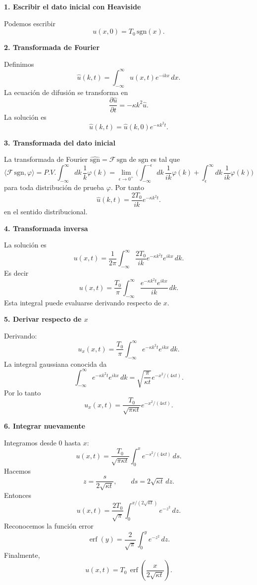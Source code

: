 \documentclass[11pt,spanish]{article}
\begin{document}
{\bf 1. Escribir el dato inicial con Heaviside}

Podemos escribir
$$
u(x,0)
=
T_0\,
\mathrm{sgn}(x).
$$

{\bf 2. Transformada de Fourier}

Definimos
$$
\hat u(k,t)
=
\int_{-\infty}^{\infty}
u(x,t)e^{-ikx}\,dx.
$$
La ecuación de difusión se transforma en
$$
\frac{\partial \hat u}{\partial t}
=
-\kappa k^2 \hat u.
$$
La solución es
$$
\hat u(k,t)
=
\hat u(k,0)
e^{-\kappa k^2 t}.
$$

{\bf 3. Transformada del dato inicial}

La transformada de Fourier $\widehat{\mathrm{sgn}}=\mathcal{F}\,\mathrm{sgn}$ de $\mathrm{sgn}$ es tal que
$$
\langle \mathcal{F}\,\mathrm{sgn},\varphi \rangle
=
P.V.
\int_{-\infty}^{\infty}
dk\,
\frac{1}{k}
\varphi(k)
=
\lim_{\epsilon\to 0^+}
\bigg(
\int_{-\infty}^{-\epsilon}
dk\,
\frac{1}{ik}
\varphi(k)
+
\int_{\epsilon}^{\infty}
dk\,
\frac{1}{ik}
\varphi(k)
\bigg)
$$
para toda distribuci\'on de prueba $\varphi$.
Por tanto
$$
\boxed{
\hat u(k,t)
=
\frac{2T_0}{ik}
e^{-\kappa k^2 t}.
}
$$
en el sentido distribucional.

{\bf 4. Transformada inversa}

La solución es
$$
u(x,t)
=
\frac1{2\pi}
\int_{-\infty}^{\infty}
\frac{2T_0}{ik}
e^{-\kappa k^2 t}
e^{ikx}
\,dk.
$$
Es decir
$$
u(x,t)
=
\frac{T_0}{\pi}
\int_{-\infty}^{\infty}
\frac{e^{-\kappa k^2 t}e^{ikx}}{ik}\,dk.
$$
Esta integral puede evaluarse derivando respecto de $x$.

{\bf 5. Derivar respecto de $x$}

Derivando:
$$
u_x(x,t)
=
\frac{T_0}{\pi}
\int_{-\infty}^{\infty}
e^{-\kappa k^2 t}
e^{ikx}
\,dk.
$$
La integral gaussiana conocida da
$$
\int_{-\infty}^{\infty}
e^{-\kappa k^2 t}
e^{ikx}
\,dk
=
\sqrt{\frac{\pi}{\kappa t}}
e^{-x^2/(4\kappa t)}.
$$
Por lo tanto
$$
u_x(x,t)
=
\frac{T_0}{\sqrt{\pi\kappa t}}
e^{-x^2/(4\kappa t)}.
$$

{\bf 6. Integrar nuevamente}

Integramos desde 0 hasta $x$:
$$
u(x,t)
=
\frac{T_0}{\sqrt{\pi\kappa t}}
\int_0^x
e^{-s^2/(4\kappa t)}
\,ds.
$$
Hacemos
$$
z=\frac{s}{2\sqrt{\kappa t}},
\qquad
ds=2\sqrt{\kappa t}\,dz.
$$
Entonces
$$
u(x,t)
=
\frac{2T_0}{\sqrt{\pi}}
\int_0^{x/(2\sqrt{\kappa t})}
e^{-z^2}\,dz.
$$
Reconocemos la función error
$$
\operatorname{erf}(y)
=
\frac2{\sqrt{\pi}}
\int_0^y e^{-z^2}\,dz.
$$
Finalmente,
$$
\boxed{
u(x,t)
=
T_0\,
\operatorname{erf}
\left(
\frac{x}{2\sqrt{\kappa t}}
\right).
}
$$
\end{document}
